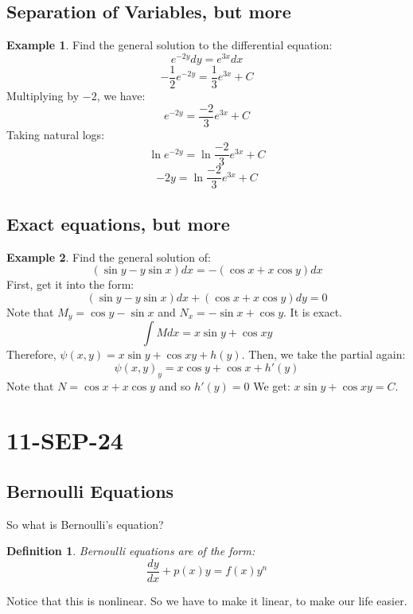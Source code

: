 \documentclass[10pt, oneside]{article}
\newtheorem{defn}{Definition}
\theoremstyle{definition}
\newtheorem{example}{Example}[section]
\begin{document}
\subsection{Separation of Variables, but more}
\begin{example}
    Find the general solution to the differential equation:
    \[e^{-2y}dy = e^{3x}dx \]
    \[-\frac{1}{2}e^{-2y} = \frac{1}{3}e^{3x} + C \]
    Multiplying by $-2$, we have:
    \[e^{-2y} = \frac{-2}{3}e^{3x} + C \]
    Taking natural logs:
    \[\ln{e^{-2y}} = \ln{\frac{-2}{3}e^{3x} + C} \]
    \[ -2y = \ln{\frac{-2}{3}e^{3x} + C} \]
\end{example}
\subsection{Exact equations, but more}
\begin{example}
    Find the general solution of:
    \[(\sin{y} - y\sin{x})dx = -(\cos{x} + x\cos{y})dx \]
First, get it into the form:
    \[(\sin{y} - y\sin{x})dx + (\cos{x} + x\cos{y})dy = 0 \]
    Note that $M_y = \cos{y}-\sin{x}$ and $N_x = -\sin{x} + \cos{y}$. It is exact. 
\[ \int{M dx} = x\sin{y} +\cos{x}y \]
Therefore, $\psi(x,y) = x\sin{y} +\cos{x}y + h(y)$. Then, we take the partial again:
\[{\psi(x,y)}_y = x\cos{y} + \cos{x} + h'(y) \]
Note that $N = \cos{x} + x\cos{y}$ and so $h'(y) = 0$
We get: $x\sin{y} +\cos{x}y = C$. 
\end{example}

\section{11-SEP-24}
\subsection{Bernoulli Equations}
So what is Bernoulli's equation?
\begin{defn}
Bernoulli equations are of the form:
\[
\frac{dy}{dx} + p(x)y = f(x)y^n
\]
\end{defn}
Notice that this is nonlinear. So we have to make it linear, to make our life easier.
\end{document}
